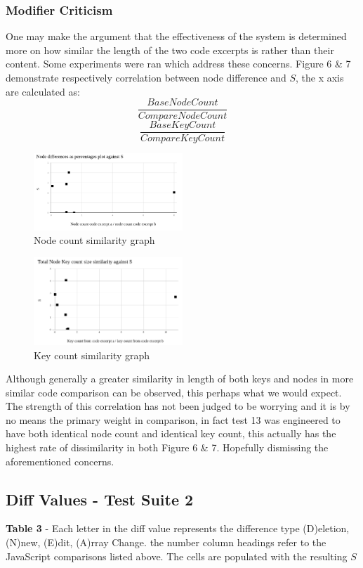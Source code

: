 \documentclass[jou,apacite]{apa6}
\begin{document}
\subsubsection{Modifier Criticism}
One may make the argument that the effectiveness of the system is determined more on how similar the length of the two code excerpts is rather than their content. Some experiments were ran which address these concerns. Figure 6 \& 7 demonstrate respectively correlation between node difference and $S$, the x axis are calculated as: \[\dfrac{Base Node Count }{Compare Node Count}\] \[\dfrac{Base Key Count }{Compare Key Count}\]

				\begin{figure}[h]
\caption{Node count similarity graph}
\centering
\includegraphics[width=0.50\textwidth]{nodecount}
\end{figure}

				\begin{figure}[h]
\caption{Key count similarity graph}
\centering
\includegraphics[width=0.50\textwidth]{keycount}
\end{figure}

Although generally a greater similarity in length of both keys and nodes in more similar code comparison can be observed, this perhaps what we would expect. The strength of this correlation has not been judged to be worrying and it is by no means the primary weight in comparison, in fact test 13 was engineered to have both identical node count and identical key count, this actually has the highest rate of dissimilarity in both Figure 6 \& 7. Hopefully dismissing the aforementioned concerns.

\subsection{Diff Values - Test Suite 2}
\textbf{Table 3} - Each letter in the diff value represents the difference type (D)eletion, (N)new, (E)dit, (A)rray Change. the number column headings refer to the JavaScript comparisons listed above. The cells are populated with the resulting $S$
\end{document}
